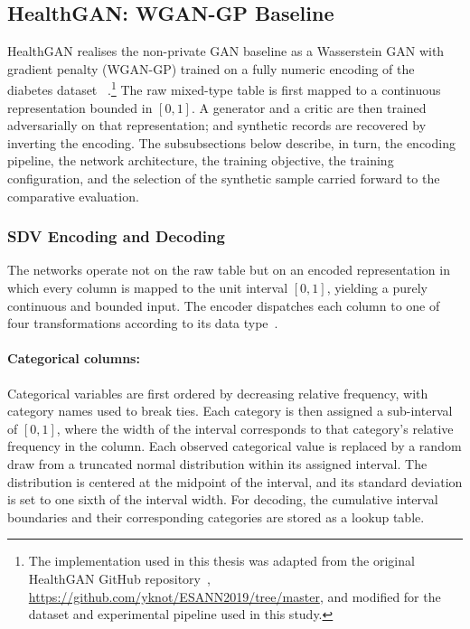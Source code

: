 \subsection{HealthGAN: WGAN-GP Baseline}
\label{sec:methods:healthgan}


HealthGAN realises the non-private GAN baseline as a Wasserstein GAN with
gradient penalty (WGAN-GP) trained on a fully numeric encoding of the
diabetes dataset~\cite{healthgan}
.\footnote{The implementation used in this
thesis was adapted from the original HealthGAN GitHub
repository~\cite{yale2019healthganCode},
\url{https://github.com/yknot/ESANN2019/tree/master}, and modified for the
dataset and experimental pipeline used in this study.} The raw mixed-type table is first mapped
to a continuous representation bounded in $[0,1]$. A generator and a critic
are then trained adversarially on that representation; and synthetic records
are recovered by inverting the encoding. The subsubsections below describe,
in turn, the encoding pipeline, the network architecture, the training
objective, the training configuration, and the selection of the synthetic
sample carried forward to the comparative evaluation.

\subsubsection{SDV Encoding and Decoding}
\label{sec:methods:healthgan:sdv}

The networks operate not on the raw table but on an encoded representation in
which every column is mapped to the unit interval $[0,1]$, yielding a purely
continuous and bounded input. The encoder dispatches each column to one of
four transformations according to its data type~\cite{patki2016synthetic}.

\paragraph{Categorical columns:}
Categorical variables are first ordered by decreasing relative frequency, with
category names used to break ties. Each category is then assigned a
sub-interval of $[0,1]$, where the width of the interval corresponds to that
category's relative frequency in the column. Each observed categorical value
is replaced by a random draw from a truncated normal distribution within its
assigned interval. The distribution is centered at the midpoint of the
interval, and its standard deviation is set to one sixth of the interval
width. For decoding, the cumulative interval boundaries and their
corresponding categories are stored as a lookup table.

